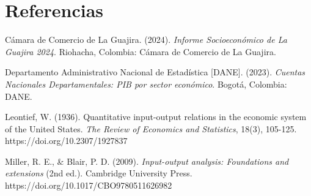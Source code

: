 \section*{Referencias}

Cámara de Comercio de La Guajira. (2024). \textit{Informe Socioeconómico de La Guajira 2024}. Riohacha, Colombia: Cámara de Comercio de La Guajira.

Departamento Administrativo Nacional de Estadística [DANE]. (2023). \textit{Cuentas Nacionales Departamentales: PIB por sector económico}. Bogotá, Colombia: DANE.

Leontief, W. (1936). Quantitative input-output relations in the economic system of the United States. \textit{The Review of Economics and Statistics}, 18(3), 105-125. https://doi.org/10.2307/1927837

Miller, R. E., \& Blair, P. D. (2009). \textit{Input-output analysis: Foundations and extensions} (2nd ed.). Cambridge University Press. https://doi.org/10.1017/CBO9780511626982

\clearpage
